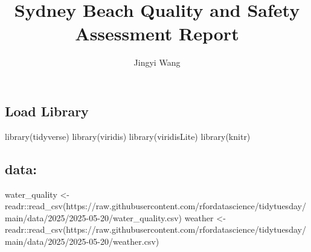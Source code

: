 \documentclass[
  11pt,
]{article}
\title{Sydney Beach Quality and Safety Assessment Report}
\author{Jingyi Wang}
\date{}
\newenvironment{Shaded}{\begin{snugshade}}{\end{snugshade}}
\newcommand{\FunctionTok}[1]{\textcolor[rgb]{0.28,0.35,0.67}{#1}}
\newcommand{\NormalTok}[1]{\textcolor[rgb]{0.00,0.23,0.31}{#1}}
\newcommand{\OtherTok}[1]{\textcolor[rgb]{0.00,0.23,0.31}{#1}}
\newcommand{\SpecialCharTok}[1]{\textcolor[rgb]{0.37,0.37,0.37}{#1}}
\newcommand{\StringTok}[1]{\textcolor[rgb]{0.13,0.47,0.30}{#1}}
\renewcommand*\contentsname{Table of contents}
\newcommand\contentsname{Table of contents}
\begin{document}
\maketitle

\renewcommand*\contentsname{Table of contents}
{
\hypersetup{linkcolor=}
\setcounter{tocdepth}{3}
\tableofcontents
}

\subsection{Load Library}\label{load-library}

\begin{Shaded}
\begin{Highlighting}[]
\FunctionTok{library}\NormalTok{(tidyverse)}
\FunctionTok{library}\NormalTok{(viridis)}
\FunctionTok{library}\NormalTok{(viridisLite)}
\FunctionTok{library}\NormalTok{(knitr)}
\end{Highlighting}
\end{Shaded}

\subsection{data:}\label{data}

\begin{Shaded}
\begin{Highlighting}[]
\NormalTok{water\_quality }\OtherTok{\textless{}{-}}\NormalTok{ readr}\SpecialCharTok{::}\FunctionTok{read\_csv}\NormalTok{(}\StringTok{\textquotesingle{}https://raw.githubusercontent.com/rfordatascience/tidytuesday/main/data/2025/2025{-}05{-}20/water\_quality.csv\textquotesingle{}}\NormalTok{)}
\NormalTok{weather }\OtherTok{\textless{}{-}}\NormalTok{ readr}\SpecialCharTok{::}\FunctionTok{read\_csv}\NormalTok{(}\StringTok{\textquotesingle{}https://raw.githubusercontent.com/rfordatascience/tidytuesday/main/data/2025/2025{-}05{-}20/weather.csv\textquotesingle{}}\NormalTok{)}
\end{Highlighting}
\end{Shaded}
\end{document}
